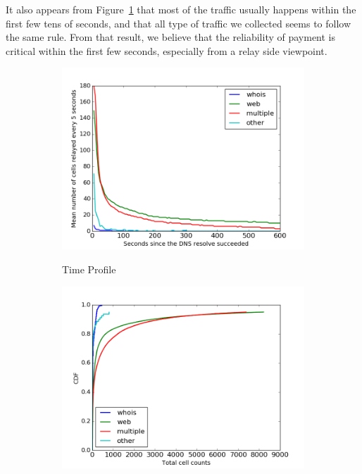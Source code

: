 It also appears from Figure~\ref{fig:stats_a} that most of the traffic usually happens within the first few tens of seconds, and that all type of traffic we collected seems to follow the same rule. From that result, we believe that the reliability of payment is critical within the first few seconds, especially from a relay side viewpoint.



\begin{figure}
	\centering
	\begin{subfigure}[t]{0.32\textwidth}
		\centering
		\includegraphics[scale=0.3]{images/exitmeasurement.png}
		\label{fig:stats_a}
		\caption{Time Profile}
	\end{subfigure}
	\begin{subfigure}[t]{0.32\textwidth}
		\centering
		\includegraphics[scale=0.3]{images/totcellcountscdf.png}

\end{subfigure}
\end{figure}
